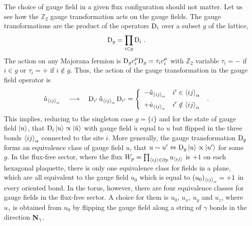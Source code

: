 The choice of gauge field in a given flux configuration should not matter. Let us see how the $\mathbb{Z}_2$ gauge transformation acts on the gauge fields.
The gauge transformations are the product of the operators $\mathrm{D}_i$ over a subset $g$ of the lattice,
\begin{equation}
    \mathrm{D}_g=\prod_{i\in g} \mathrm{D}_i \; .
\end{equation}
The action on any Majorana fermion is $\mathrm{D}_g c_i^\mu \mathrm{D}_g = \tau_i c_i^\mu$ with $\mathbb{Z}_2$ variable $\tau_i=-$ if $i \in g$  or $\tau_i=+$ if $i \notin g$.
Thus, the action of the gauge transformation in the gauge field operator is
\begin{equation}
     \hat{u}_{\braket{ij}_{\alpha} } \quad \longrightarrow \quad \rmD_{i'} \, \hat{u}_{\braket{ij}_{\alpha} }\, \rmD_{i'} = %
    \left\{\begin{array}{cc}   - \hat{u}_{\braket{ij}_{\alpha} } & i'\in \braket{ij}_{\alpha} \\[6pt]   + \hat{u}_{\braket{ij}_{\alpha} } & i'\notin \braket{ij}_{\alpha} \end{array}\right. \;.
\end{equation}
This implies, reducing to the singleton case $g=\{i\}$ and for the state of gauge field $\ket{u}$, that $\mathrm{D}_i\ket{u}\propto \ket{\tilde{u}} $ with gauge field $\tilde{u}$ equal to $u$ but flipped in the three bonds ${\braket{ij}_{\alpha} }$ connected to the site $i$.
More generally, the gauge transformation $\mathrm{D}_g$ forms an equivalence class of gauge field $u$, that $u\sim u' \Leftrightarrow \mathrm{D}_g \ket{u} \propto \ket{u'}$ for some $g$.
In the flux-free sector, where the flux $W_p=\prod_{\braket{ij}\in \partial p} u_{\braket{ij}}$ is $+1$ on each hexagonal plaquette, there is only one equivalence class for fields in a plane, which are all equivalent to the gauge field $u_0$ which is equal to $(u_0)_{\braket{ij}_\alpha}=+1$ in every oriented bond. In the torus, however, there are four equivalence classes  for gauge fields in the flux-free sector. A choice for them is $u_0$, $u_x$, $u_y$ and $u_z$, where $u_\gamma$ is obtained from $u_0$ by flipping the gauge field along a string of $\gamma$ bonds in the direction $\mathbf{N}_\gamma$.






